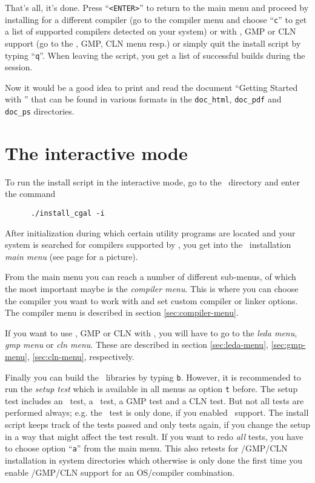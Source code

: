 That's all, it's done. Press ``\texttt{<ENTER>}'' to return to the
main menu and proceed by installing for a different compiler (go to
the compiler menu and choose ``\texttt{c}'' to get a list of
supported compilers detected on your system) or with \leda, GMP or
CLN support (go to the \leda, GMP, CLN menu resp.) or simply quit
the install script by typing ``\texttt{q}''. When leaving the
script, you get a list of successful builds during the session.

Now it would be a good idea to print and read the document ``Getting
Started with \cgal'' that can be found in various formats in the
\texttt{doc\_html}, \texttt{doc\_pdf} and \texttt{doc\_ps}
directories.

\section{The interactive mode}\label{sec:interactive-mode}

To run the install script in the interactive mode, go to the \cgaldir\ 
directory and enter the command
\begin{verbatim}
      ./install_cgal -i
\end{verbatim}

After initialization during which certain utility programs are located
and your system is searched for compilers supported by \cgal, you get
into the \cgal\ installation \textit{main menu} (see page
\pageref{pic:main-menu} for a picture).

From the main menu you can reach a number of different sub-menus, of
which the most important maybe is the \textit{compiler menu}. This is
where you can choose the compiler you want to work with and set custom
compiler or linker options.  The compiler menu is described in section
\ref{sec:compiler-menu}.

If you want to use \leda, GMP or CLN with \cgal, you will have to go
to the \textit{leda menu}, \textit{gmp menu} or \textit{cln menu}.
These are described in section \ref{sec:leda-menu},
\ref{sec:gmp-menu}, \ref{sec:cln-menu}, respectively.

Finally you can build the \cgal\ libraries by typing \texttt{b}.
However, it is recommended to run the \textit{setup test} which is
available in all menus as option \texttt{t} before. The setup test
includes an \stl\ test, a \leda\ test, a GMP test and a CLN test. But
not all tests are performed always; e.g. the \leda\ test is only done,
if you enabled \leda\ support. The install script keeps track of the
tests passed and only tests again, if you change the setup in a way
that might affect the test result. If you want to redo \textit{all}
tests, you have to choose option ``\texttt{a}'' from the main menu.
This also retests for \leda/GMP/CLN installation in system directories
which otherwise is only done the first time you enable \leda/GMP/CLN
support for an OS/compiler combination.

